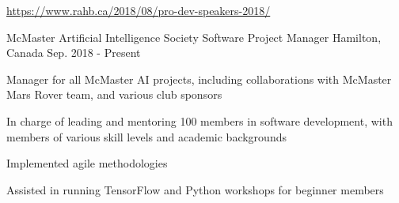 \begin{cventries}
{\begin{cvitems}
        \item {\url{https://www.rahb.ca/2018/08/pro-dev-speakers-2018/}}
      \end{cvitems}
    }
\vspace{4mm}
\cventry
	{McMaster Artificial Intelligence Society}
	{Software Project Manager}
	{Hamilton, Canada}
	{Sep. 2018 - Present}
	{
		\begin{cvitems}
			\item {Manager for all McMaster AI projects, including collaborations with 
McMaster Mars Rover team, and various club sponsors}
			\item { In charge of leading and mentoring 100 members in software development, with 
members of various skill levels and academic backgrounds}
			\item {Implemented agile methodologies}
			\item {Assisted in running TensorFlow and Python workshops for beginner members}
		\end{cvitems} 
	}



\end{cventries}
